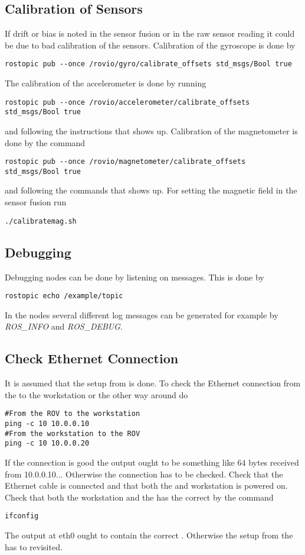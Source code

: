 \subsection{Calibration of Sensors}
If drift or bias is noted in the sensor fusion or in the raw sensor reading it could be due to bad calibration of the sensors.
Calibration of the gyroscope is done by
\begin{lstlisting}
rostopic pub --once /rovio/gyro/calibrate_offsets std_msgs/Bool true
\end{lstlisting}
The calibration of the accelerometer is done by running
\begin{lstlisting}
rostopic pub --once /rovio/accelerometer/calibrate_offsets std_msgs/Bool true
\end{lstlisting}
and following the instructions that shows up.
Calibration of the magnetometer is done by the command
\begin{lstlisting}
rostopic pub --once /rovio/magnetometer/calibrate_offsets std_msgs/Bool true
\end{lstlisting}
and following the commands that shows up.
For setting the magnetic field in the sensor fusion run 
\begin{lstlisting}
./calibratemag.sh
\end{lstlisting}

\subsection{\abbrROS Debugging}
Debugging \abbrROS nodes can be done by listening on \abbrROS messages. This is done by 
\begin{lstlisting}
rostopic echo /example/topic
\end{lstlisting}
In the nodes several different log messages can be generated for example by \textit{ROS\_INFO} and \textit{ROS\_DEBUG}.

\subsection{Check Ethernet Connection}
It is assumed that the setup from  is done. To check the Ethernet connection from the \abbrROV to the workstation or the other way around do
\begin{lstlisting}
#From the ROV to the workstation
ping -c 10 10.0.0.10 
#From the workstation to the ROV
ping -c 10 10.0.0.20
\end{lstlisting}
If the connection is good the output ought to be something like 64 bytes received from 10.0.0.10... Otherwise the connection has to be checked. Check that the Ethernet cable is connected and that both the \abbrROV and workstation is powered on. Check that both the workstation and the \abbrROV has the correct \abbrIP by the command
\begin{lstlisting}
ifconfig
\end{lstlisting}
The output at eth0 ought to contain the correct \abbrIP. Otherwise the setup from the  has to revisited.

